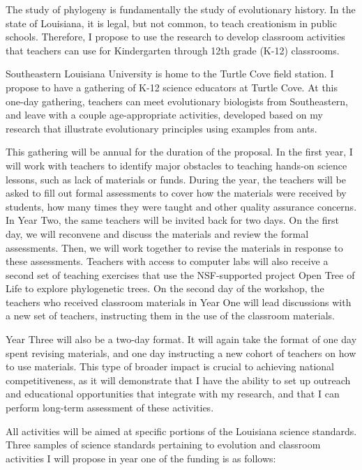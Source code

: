\documentclass[12pt]{article}
\begin{document}
The study of phylogeny is fundamentally the study of evolutionary history. 
In the state of Louisiana, it is legal, but not common, to teach creationism in public schools.
Therefore, I propose to use the research to develop classroom activities that teachers can use for Kindergarten through 12th grade (K-12) classrooms. \par
Southeastern Louisiana University is home to the Turtle Cove field station.
I propose to have a gathering of K-12 science educators at Turtle Cove. 
At this one-day gathering, teachers can meet evolutionary biologists from Southeastern, and leave with a couple age-appropriate activities, developed based on my research that illustrate evolutionary principles using examples from ants. \par
This gathering will be annual for the duration of the proposal.
In the first year, I will work with teachers to identify major obstacles to teaching hands-on science lessons, such as lack of materials or funds.
During the year, the teachers will be asked to fill out formal assessments to cover how the materials were received by students, how many times they were taught and other quality assurance concerns.
In Year Two, the same teachers will be invited back for two days.
On the first day, we will reconvene and discuss the materials and review the formal assessments.
Then, we will work together to revise the materials in response to these assessments.
Teachers with access to computer labs will also receive a second set of teaching exercises that use the NSF-supported project Open Tree of Life to explore phylogenetic trees.
On the second day of the workshop, the teachers who received classroom materials in Year One will lead discussions with a new set of teachers, instructing them in the use of the classroom materials.
\par
Year Three will also be a two-day format.
It will again take the format of one day spent revising materials, and one day instructing a new cohort of teachers on how to use materials.
This type of broader impact is crucial to achieving national competitiveness, as it will demonstrate that I have the ability to set up outreach and educational opportunities that integrate with my research, and that I can perform long-term assessment of these activities. \par
All activities will be aimed at specific portions of the Louisiana science standards. 
Three samples of science standards pertaining to evolution and classroom activities I will propose in year one of the funding is as follows: \par
\end{document}
